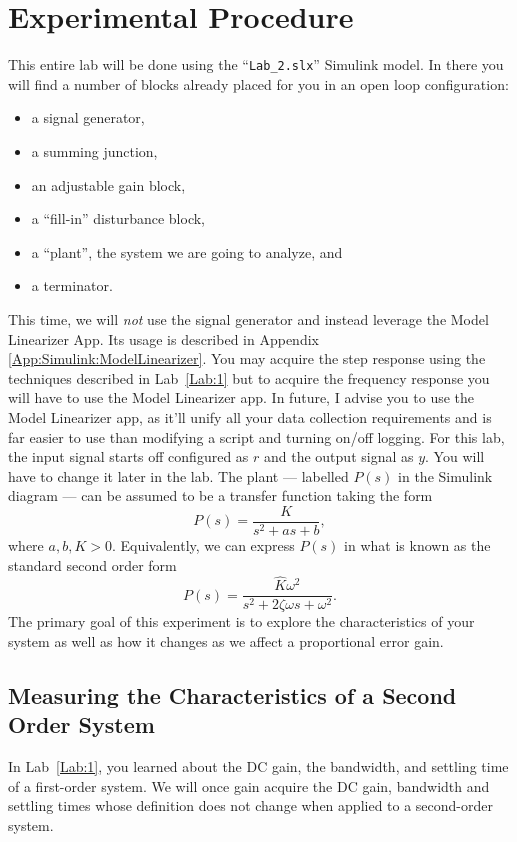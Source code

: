 \section{Experimental Procedure}
This entire lab will be done using the ``\texttt{Lab\_2.slx}'' Simulink model.
In there you will
find a number of blocks already placed for you in an open loop configuration:
\begin{itemize}
  \item{a signal generator,}
  \item{a summing junction,}
  \item{an adjustable gain block,}
  \item{a ``fill-in'' disturbance block,}
  \item{a ``plant'', the system we are going to analyze, and}
  \item{a terminator.}
\end{itemize}
This time, we will \emph{not} use the signal generator and instead leverage
the Model Linearizer App. Its usage is described in Appendix
\ref{App:Simulink:ModelLinearizer}. You may acquire the step response
using the techniques described in Lab~\ref{Lab:1} but to acquire the frequency
response you will have to use the Model Linearizer app. In future, I advise
you to use the Model Linearizer app, as it'll unify all your data collection
requirements and is far easier to use than modifying a script and turning
on/off logging. For this lab, the input signal starts off configured
as \(r\) and the output signal as \(y.\) You will have to change it later
in the lab.
%
The plant --- labelled \(P(s)\) in the Simulink diagram --- can be assumed
to be a transfer function taking the form
\[
  P(s) = \frac{K}{s^2 + a s + b},
\]
where \(a, b, K > 0.\) Equivalently, we can express \(P(s)\) in what is known
as the standard second order form
\[
  P(s) = \frac{\hat{K} \omega^2}{s^2 + 2 \zeta \omega s + \omega^2}.
\]
The primary goal of this experiment is to explore
the characteristics of your system as well as how it changes as we
affect a proportional error gain.

\subsection{Measuring the Characteristics of a Second Order System}
In Lab~\ref{Lab:1}, you learned about the DC gain, the bandwidth, and
settling time of a first-order system.
We will once gain acquire the DC gain, bandwidth and settling times
whose definition does not change when applied to a second-order system.

